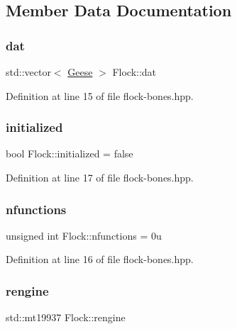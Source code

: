 \subsection{Member Data Documentation}
\mbox{\label{class_flock_af493163235db2dcb44b8c5e615f52bdb}} 
\subsubsection{\texorpdfstring{dat}{dat}}
{\footnotesize\ttfamily std\+::vector$<$ \hyperlink{class_geese}{Geese} $>$ Flock\+::dat}



Definition at line 15 of file flock-\/bones.\+hpp.

\mbox{\label{class_flock_aad9b90040d349a23b33e09292bb964db}} 
\subsubsection{\texorpdfstring{initialized}{initialized}}
{\footnotesize\ttfamily bool Flock\+::initialized = false}



Definition at line 17 of file flock-\/bones.\+hpp.

\mbox{\label{class_flock_a77220682e593e9d455f56a5607981ff2}} 
\subsubsection{\texorpdfstring{nfunctions}{nfunctions}}
{\footnotesize\ttfamily unsigned int Flock\+::nfunctions = 0u}



Definition at line 16 of file flock-\/bones.\+hpp.

\mbox{\label{class_flock_a0e3ce6d007f667eea9f036cddb6789b6}} 
\subsubsection{\texorpdfstring{rengine}{rengine}}
{\footnotesize\ttfamily std\+::mt19937 Flock\+::rengine}



